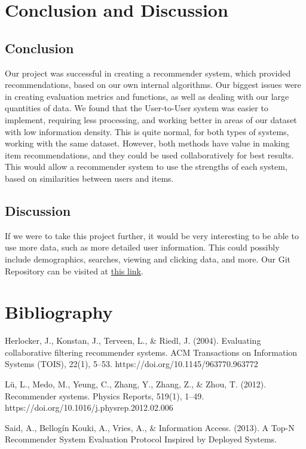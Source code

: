 \documentclass[11pt]{article}
\begin{document}
\section{Conclusion and Discussion}
\subsection{Conclusion}
Our project was successful in creating a recommender system, which provided recommendations, based on our own internal algorithms. Our biggest issues were in creating evaluation metrics and functions, as well as dealing with our large quantities of data. We found that the User-to-User system was easier to implement, requiring less processing, and working better in areas of our dataset with low information density. This is quite normal, for both types of systems, working with the same dataset. However, both methods have value in making item recommendations, and they could be used collaboratively for best results. This would allow a recommender system to use the strengths of each system, based on similarities between users and items. 

\subsection{Discussion}
If we were to take this project further, it would be very interesting to be able to use more data, such as more detailed user information. This could possibly include demographics, searches, viewing and clicking data, and more.
Our Git Repository can be visited at \href{https://github.com/Kamiel-Fokkink/Recommender_Systems_Kamiel_Baran_Sergio_Tomas}{this link}.
 

\section{Bibliography}
Herlocker, J., Konstan, J., Terveen, L., & Riedl, J. (2004). Evaluating collaborative filtering recommender systems. ACM Transactions on Information Systems (TOIS), 22(1), 5–53. https://doi.org/10.1145/963770.963772

Lü, L., Medo, M., Yeung, C., Zhang, Y., Zhang, Z., \& Zhou, T. (2012). Recommender systems. Physics Reports, 519(1), 1–49. https://doi.org/10.1016/j.physrep.2012.02.006

Said, A., Bellogín Kouki, A., Vries, A., & Information Access. (2013). A Top-N Recommender System Evaluation Protocol Inspired by Deployed Systems.
\end{document}
